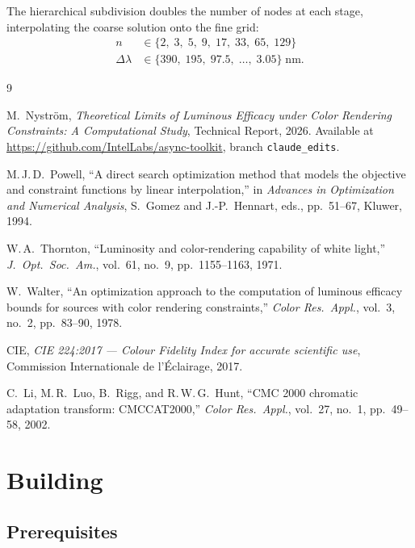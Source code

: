 \documentclass[11pt]{article}
\begin{document}
The hierarchical subdivision doubles the number of nodes at each stage,
interpolating the coarse solution onto the fine grid:
\begin{align}
  n &\in \{2,\; 3,\; 5,\; 9,\; 17,\; 33,\; 65,\; 129\} \\[4pt]
  \Delta\lambda &\in \{390,\; 195,\; 97.5,\; \ldots,\; 3.05\} \;\text{nm}.
\end{align}

\begin{thebibliography}{9}

M.~Nystr\"om,
\emph{Theoretical Limits of Luminous Efficacy under Color Rendering
Constraints: A Computational Study},
Technical Report, 2026.
Available at \url{https://github.com/IntelLabs/async-toolkit}, branch
\texttt{claude\_edits}.

M.\,J.\,D.~Powell,
``A direct search optimization method that models the objective and
constraint functions by linear interpolation,''
in \emph{Advances in Optimization and Numerical Analysis},
S.~Gomez and J.-P.~Hennart, eds., pp.~51--67, Kluwer, 1994.

W.\,A.~Thornton,
``Luminosity and color-rendering capability of white light,''
\emph{J.\ Opt.\ Soc.\ Am.}, vol.~61, no.~9, pp.~1155--1163, 1971.

W.~Walter,
``An optimization approach to the computation of luminous efficacy
bounds for sources with color rendering constraints,''
\emph{Color Res.\ Appl.}, vol.~3, no.~2, pp.~83--90, 1978.

CIE,
\emph{CIE 224:2017 --- Colour Fidelity Index for accurate scientific
use}, Commission Internationale de l'\'Eclairage, 2017.

C.~Li, M.\,R.~Luo, B.~Rigg, and R.\,W.\,G.~Hunt,
``CMC 2000 chromatic adaptation transform: CMCCAT2000,''
\emph{Color Res.\ Appl.}, vol.~27, no.~1, pp.~49--58, 2002.

\end{thebibliography}

\section{Building}
\label{sec:building}

\subsection{Prerequisites}
\end{document}
